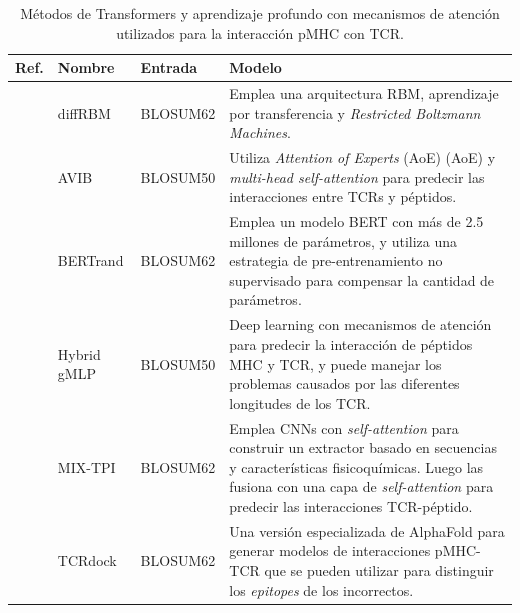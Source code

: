 \begin{table}[h]
	\caption{Métodos de Transformers y aprendizaje profundo con mecanismos de atención utilizados para la interacción pMHC con TCR.}
	\label{tab:TCR}
	\setlength{\tabcolsep}{0.5em} %
	{\renewcommand{\arraystretch}{1.1}%
		
		\begin{scriptsize}
		\begin{tabular}{p{2.5cm}p{2.5cm}p{2cm}p{5.5cm}}
			\multicolumn{1}{l}{\textbf{Ref.}}                                   & \textbf{Nombre}          & \textbf{Entrada}              & \textbf{Modelo}     \\  \hline
			
			\cite{bravi2023transfer}	&	diffRBM	&	BLOSUM62	 &	Emplea una arquitectura RBM, aprendizaje por transferencia y \textit{Restricted Boltzmann Machines}.	\\%
			
			\cite{10.1093/bioinformatics/btac820}	&	AVIB	&	BLOSUM50	&	Utiliza \textit{Attention of Experts} (AoE) (AoE) y \textit{multi-head self-attention} para predecir las interacciones entre TCRs y péptidos.	\\
			
			\cite{myronov2023bertrand}	&	BERTrand	&	BLOSUM62	&	Emplea un modelo BERT con más de 2.5 millones de parámetros, y utiliza una estrategia de pre-entrenamiento no supervisado para compensar la cantidad de parámetros.\\ %
			
			\cite{zhang2023hybrid}	&	Hybrid gMLP 	&	BLOSUM50	&	Deep learning con mecanismos de atención para predecir la interacción de péptidos MHC y TCR, y puede manejar los problemas causados por las diferentes longitudes de los TCR.\\
			
		
			
			\cite{yang2023mix}	&	MIX-TPI	&	BLOSUM62	&	Emplea CNNs con \textit{self-attention} para construir un extractor basado en secuencias y características fisicoquímicas. Luego las fusiona con una capa de \textit{self-attention} para predecir las interacciones TCR-péptido.\\
			
			\cite{bradley2023structure}	&	TCRdock	&	BLOSUM62	&	Una versión especializada de AlphaFold para generar modelos de interacciones pMHC-TCR que se pueden utilizar para distinguir los \textit{epitopes} de los incorrectos. 	\\
			

\end{tabular}
\end{scriptsize}}
\end{table}
